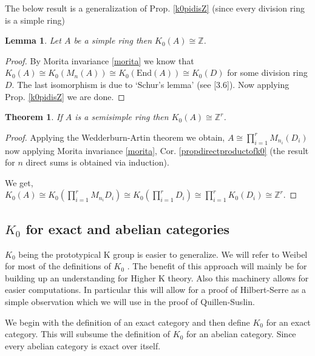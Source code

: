 \documentclass[12pt]{article}
\numberwithin{equation}{section}
\newcommand{\Z}{\mathbb{Z}}
\newcounter{dummy} \numberwithin{dummy}{section}
\newtheorem{theorem}[dummy]{Theorem}
\newtheorem{lemma}[dummy]{Lemma}
\begin{document}
	The below result is a generalization of Prop. \ref{k0pidisZ} (since every division ring is a simple ring)
	\begin{lemma}
		Let $A$ be a simple ring then $K_0(A) \cong \Z $.
	\end{lemma}
	\begin{proof}
		By Morita invariance \ref{morita} we know that $K_0(A) \cong K_0(M_n(A)) \cong K_0(\mathrm{End}(A)) \cong K_0(D)$ for some division ring $D$. The last isomorphism is due to `Schur's lemma' (see \cite{lam2001first}[3.6]). Now applying Prop. \ref{k0pidisZ} we are done.
	\end{proof}
	\begin{theorem}
		If $A$ is a semisimple ring then $K_0(A)\cong \Z^r$.
	\end{theorem}
	\begin{proof}
		Applying the Wedderburn-Artin theorem we obtain, $A \cong \prod_{i=1}^r M_{n_i} (D_i)$ now applying Morita invariance \ref{morita}, Cor. \ref{propdirectproductofk0} (the result for $n$ direct sums is obtained via induction).
		
		We get, $K_0(A) \cong K_0(\prod_{i=1}^r M_{n_i} D_i) \cong K_0(\prod_{i=1}^r D_i) \cong \prod_{i=1}^r K_0(D_i) \cong \Z^r$.
	\end{proof}
	

\subsection{$K_0$ for exact and abelian categories}
	$K_0$ being the prototypical K group is easier to generalize. We will refer to Weibel for most of the definitions of $K_0$ \cite{weibel2013k}. The benefit of this approach will mainly be for building up an understanding for Higher K theory. Also this machinery allows for easier computations. In particular this will allow for a proof of Hilbert-Serre as a simple observation which we will use in the proof of Quillen-Suslin.
	
	We begin with the definition of an exact category and then define $K_0$ for an exact category. This will subsume the definition of $K_0$ for an abelian category. Since every abelian category is exact over itself.
	
\end{document}
